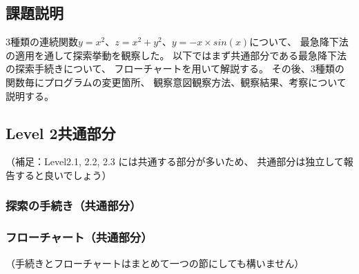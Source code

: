 \subsection{課題説明}
3種類の連続関数$y=x^2$、$z=x^2+y^2$、$y=-x \times sin(x)$について、
最急降下法の適用を通して探索挙動を観察した。
以下ではまず共通部分である最急降下法の探索手続きについて、
フローチャートを用いて解説する。
その後、3種類の関数毎にプログラムの変更箇所、
観察意図観察方法、観察結果、考察について説明する。


\subsection{Level 2共通部分}
（補足：Level2.1, 2.2, 2.3 には共通する部分が多いため、
共通部分は独立して報告すると良いでしょう）

\subsubsection{探索の手続き（共通部分）}

\subsubsection{フローチャート（共通部分）}
（手続きとフローチャートはまとめて一つの節にしても構いません）

